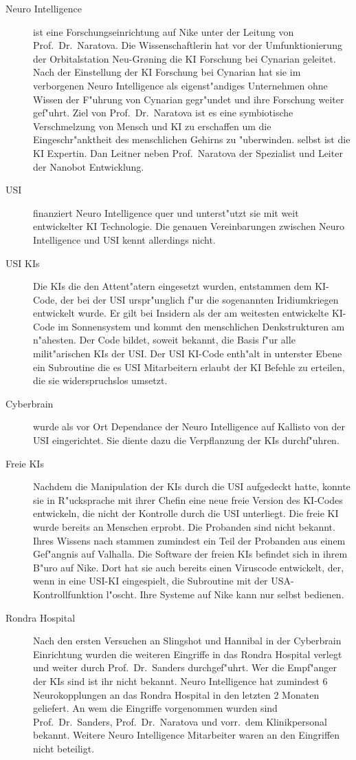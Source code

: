 \begin{description}
	\item[Neuro Intelligence] ist eine Forschungseinrichtung auf Nike unter der Leitung von Prof.~Dr.~Naratova. Die Wissenschaftlerin hat 
		vor der Umfunktionierung der Orbitalstation Neu-Gr{\o}ning die KI Forschung bei Cynarian geleitet. Nach der Einstellung der KI Forschung bei Cynarian hat sie im verborgenen Neuro Intelligence als eigenst"andiges Unternehmen ohne Wissen der F"uhrung von Cynarian gegr"undet und ihre Forschung weiter gef"uhrt. Ziel von Prof.~Dr.~Naratova ist es eine symbiotische Verschmelzung von Mensch und KI zu erschaffen um die Eingeschr"anktheit des menschlichen Gehirns zu "uberwinden. \ml{} selbst ist die KI Expertin. Dan Leitner neben Prof.~Naratova der Spezialist und Leiter der Nanobot Entwicklung.
	\item[USI] finanziert Neuro Intelligence quer und unterst"utzt sie mit weit entwickelter KI Technologie. Die genauen Vereinbarungen 
		zwischen Neuro Intelligence und USI kennt \ml{} allerdings nicht.
    \item[USI KIs] Die KIs die den Attent"atern eingesetzt wurden, entstammen dem KI-Code, der bei der USI urspr"unglich f"ur die  
		sogenannten Iridiumkriegen entwickelt wurde. Er gilt bei Insidern als der am weitesten entwickelte KI-Code im Sonnensystem und kommt den menschlichen Denkstrukturen am n"ahesten. Der Code bildet, soweit \ml{} bekannt, die Basis f"ur alle milit"arischen KIs der USI. Der USI KI-Code enth"alt in unterster Ebene ein Subroutine die es USI Mitarbeitern erlaubt der KI Befehle zu erteilen, die sie widerspruchslos umsetzt.
	\item[Cyberbrain] wurde als vor Ort Dependance der Neuro Intelligence auf Kallisto von der USI eingerichtet. Sie diente dazu die		
		Verpflanzung der KIs durchf"uhren.
	\item[Freie KIs] Nachdem \ml{} die Manipulation der KIs durch die USI aufgedeckt hatte, konnte sie in R"ucksprache mit ihrer Chefin 
		eine neue freie Version des KI-Codes entwickeln, die nicht der Kontrolle durch die USI unterliegt. Die freie KI wurde bereits an Menschen erprobt. Die Probanden sind \ml{} nicht bekannt. Ihres Wissens nach stammen zumindest ein Teil der Probanden aus einem Gef"angnis auf Valhalla. Die Software der freien KIs befindet sich in ihrem B"uro auf Nike. Dort hat sie auch bereits einen Viruscode entwickelt, der, wenn in eine USI-KI eingespielt, die Subroutine mit der USA-Kontrollfunktion l"oscht. Ihre Systeme auf Nike kann \ml{} nur selbst bedienen.
	\item[Rondra Hospital] Nach den ersten Versuchen an Slingshot und Hannibal in der Cyberbrain Einrichtung wurden die weiteren Eingriffe 	
		in das Rondra Hospital verlegt und weiter durch Prof.~Dr.~Sanders durchgef"uhrt. Wer die Empf"anger der KIs sind ist ihr nicht bekannt. Neuro Intelligence hat zumindest 6 Neurokopplungen an das Rondra Hospital in den letzten 2 Monaten geliefert. An wem die Eingriffe vorgenommen wurden sind Prof.~Dr.~Sanders, Prof.~Dr.~Naratova und vorr.~dem Klinikpersonal bekannt. Weitere Neuro Intelligence Mitarbeiter waren an den Eingriffen nicht beteiligt.
\end{description}

